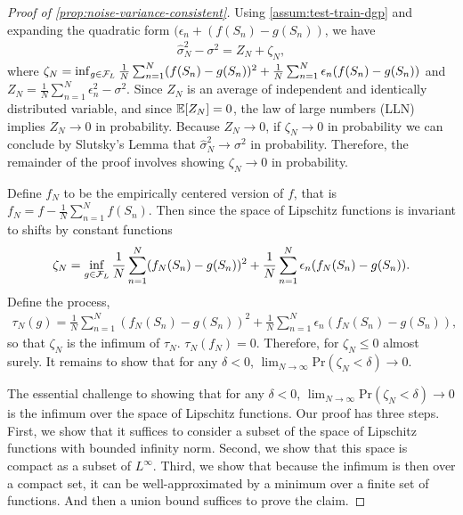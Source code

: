 \begin{proof}[Proof of \cref{prop:noise-variance-consistent}]
Using \cref{assum:test-train-dgp} and expanding the quadratic form $(\epsilon_n + (f(S_n) - g(S_n))$, we have 
\begin{align}
    \hat{\sigma}^2_N - \sigma^2 = Z_N + \zeta_N,
\end{align}
where $\zeta_N = \inf_{g \in \mathcal{F}_L} \frac{1}{N}\sum_{n=1}^N (f(S_n) - g(S_n))^2 +\frac{1}{N}\sum_{n=1}^N\epsilon_n (f(S_n) - g(S_n))$ and  $Z_N = \frac{1}{N}\sum_{n=1}^N \epsilon_n^2 - \sigma^2$. Since $Z_N$ is an average of independent and identically distributed variable, and since $\mathbb{E}[Z_N] = 0$, the law of large numbers (LLN) implies $Z_N \to 0$ in probability. Because $Z_N \to 0$, if $\zeta_N \to 0$ in probability we can conclude by Slutsky's Lemma that $\hat{\sigma}^2_N \to \sigma^2$ in probability. Therefore, the remainder of the proof involves showing $\zeta_N \to 0$ in probability. 

 Define $f_N$ to be the empirically centered version of $f$, that is $f_N = f - \frac{1}{N}\sum_{n=1}^N f(S_n)$. Then since the space of Lipschitz functions is invariant to shifts by constant functions
\begin{align}
    \zeta_N = \inf_{g \in \mathcal{F}_L} \frac{1}{N}\sum_{n=1}^N (f_N(S_n) - g(S_n))^2 +\frac{1}{N}\sum_{n=1}^N\epsilon_n (f_N(S_n) - g(S_n)).
\end{align}
Define the process,
\begin{align}\label{eqn:emp-process-def}
    \tau_N(g) = \frac{1}{N}\sum_{n=1}^N (f_N(S_n) - g(S_n))^2 +\frac{1}{N}\sum_{n=1}^N\epsilon_n (f_N(S_n) - g(S_n)),
\end{align}
so that $\zeta_N$ is the infimum of $\tau_N$. $\tau_N(f_N) = 0$. Therefore, for $\zeta_N \leq 0$ almost surely. It remains to show that for any $\delta < 0$, $ \lim_{N \to \infty} \mathrm{Pr}(\zeta_N <\delta) \to 0$.

 The essential challenge to showing that for any $\delta < 0$, $ \lim_{N \to \infty} \mathrm{Pr}(\zeta_N <\delta) \to 0$ is the infimum over the space of Lipschitz functions. Our proof has three steps. First, we show that it suffices to consider a subset of the space of Lipschitz functions with bounded infinity norm. Second, we show that this space is compact as a subset of $L^{\infty}$. Third, we show that because the infimum is then over a compact set, it can be well-approximated by a minimum over a finite set of functions. And then a union bound suffices to prove the claim.



\end{proof}
